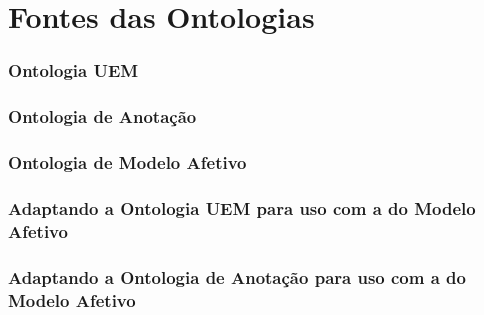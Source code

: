 \chapter{Fontes das Ontologias} \label{cap:fo}

\lstset{language=XML}

\subsection*{Ontologia UEM}


\subsection*{Ontologia de Anotação}


\subsection*{Ontologia de Modelo Afetivo}


\subsection*{Adaptando a Ontologia UEM para uso com a do Modelo Afetivo}


\subsection*{Adaptando a Ontologia de Anotação para uso com a do Modelo Afetivo}

